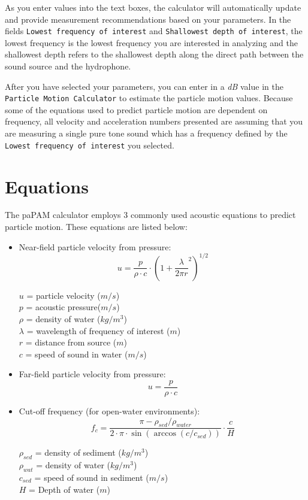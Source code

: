 \documentclass[11pt]{report}
\begin{document}
As you enter values into the text boxes, the calculator will automatically update and provide measurement recommendations based on your parameters.  In the fields \texttt{Lowest frequency of interest} and \texttt{Shallowest depth of interest}, the lowest frequency is the lowest frequency you are interested in analyzing and the shallowest depth refers to the shallowest depth along the direct path between the sound source and the hydrophone.

After you have selected your parameters, you can enter in a \textit{dB} value in the \texttt{Particle Motion Calculator} to estimate the particle motion values.  Because some of the equations used to predict particle motion are dependent on frequency, all velocity and acceleration numbers presented are assuming that you are measuring a single pure tone sound which has a frequency defined by the \texttt{Lowest frequency of interest} you selected.

\section{Equations}
The paPAM calculator employs 3 commonly used acoustic equations to predict particle motion.  These equations are listed below:

\begin{itemize}
\item Near-field particle velocity from pressure:
$$u = \frac{p}{\rho \cdot c} \cdot \left(1 + \frac{\lambda}{2 \pi r}^2 \right)^{1/2}$$
\begin{flushleft}
$u$ = particle velocity ($m/s$)\\
$p$ = acoustic pressure($m/s$)\\
$\rho$ = density of water ($kg/m^3$)\\
$\lambda $ = wavelength of frequency of interest ($m$)\\
$r$ = distance from source ($m$)\\
$c$ = speed of sound in water ($m/s$)\\
\end{flushleft}
\item Far-field particle velocity from pressure:
$$u = \frac{p}{\rho \cdot c}$$
\item Cut-off frequency (for open-water environments):
$$f_c = \frac{\pi - \rho_{sed}/\rho_{water}}{2 \cdot \pi \cdot \sin \left( \arccos \left( c/c_{sed} \right) \right)} \cdot \frac{c}{H}$$
\begin{flushleft}
$\rho_{sed}$ = density of sediment ($kg/m^3$)\\
$\rho_{wat}$ = density of water ($kg/m^3$)\\
$c_{sed}$ = speed of sound in sediment ($m/s$)\\
$H$ = Depth of water ($m$)\\
\end{flushleft}
\end{itemize}
\end{document}
